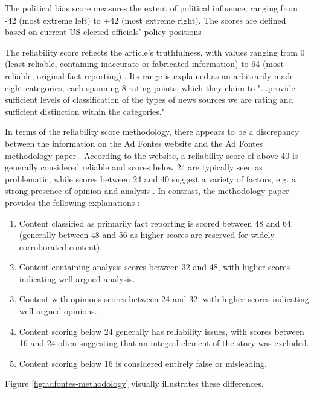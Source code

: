 
The political bias score measures the extent of political influence, ranging from -42 (most extreme left) to +42 (most extreme right).
The scores are defined based on current US elected officials' policy positions \cite{otero-2021-adfontes-methodology}

The reliability score reflects the article's truthfulness, with values ranging from 0 (least reliable, containing inaccurate or fabricated information) to 64 (most reliable, original fact reporting) \cite{adfontes-bias-reliability}. Its range is explained as an arbitrarily made eight categories, each spanning 8 rating points, which they claim to "...provide sufficient levels of classification of the types of news sources we are rating and sufficient distinction within the categories." \cite{otero-2021-adfontes-methodology}

In terms of the reliability score methodology,  there appears to be a discrepancy between the information on the Ad Fontes website \cite{adfontes-bias-reliability} and the Ad Fontes methodology paper \cite{otero-2021-adfontes-methodology}. According to the website, a reliability score of above 40 is generally considered reliable and scores below 24 are typically seen as problematic, while scores between 24 and 40 suggest a variety of factors, e.g. a strong presence of opinion and analysis \cite{adfontes-bias-reliability}. In contrast, the methodology paper provides the following explanations \cite{otero-2021-adfontes-methodology}:
\begin{enumerate}
    \item Content classified as primarily fact reporting is scored between 48 and 64 (generally between 48 and 56 as higher scores are reserved for widely corroborated content).
    \item Content containing analysis scores between 32 and 48, with higher scores indicating well-argued analysis.
    \item Content with opinions scores between 24 and 32, with higher scores indicating well-argued opinions.
    \item Content scoring below 24 generally has reliability issues, with scores between 16 and 24 often suggesting that an integral element of the story was excluded.
    \item Content scoring below 16 is considered entirely false or misleading.
\end{enumerate}
Figure \ref{fig:adfontes-methodology} visually illustrates these differences.


